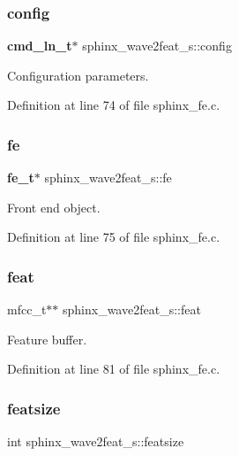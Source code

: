 \subsubsection{config}
{\footnotesize\ttfamily \textbf{ cmd\+\_\+ln\+\_\+t}$\ast$ sphinx\+\_\+wave2feat\+\_\+s\+::config}



Configuration parameters. 



Definition at line 74 of file sphinx\+\_\+fe.\+c.

\mbox{\label{structsphinx__wave2feat__s_a5882f148fe200890855304b46f00ee4b}} 
\subsubsection{fe}
{\footnotesize\ttfamily \textbf{ fe\+\_\+t}$\ast$ sphinx\+\_\+wave2feat\+\_\+s\+::fe}



Front end object. 



Definition at line 75 of file sphinx\+\_\+fe.\+c.

\mbox{\label{structsphinx__wave2feat__s_ab43d8d5721133bcaf02da23c0bbb58ae}} 
\subsubsection{feat}
{\footnotesize\ttfamily mfcc\+\_\+t$\ast$$\ast$ sphinx\+\_\+wave2feat\+\_\+s\+::feat}



Feature buffer. 



Definition at line 81 of file sphinx\+\_\+fe.\+c.

\mbox{\label{structsphinx__wave2feat__s_ac041852de738a42752be67cceb16660c}} 
\subsubsection{featsize}
{\footnotesize\ttfamily int sphinx\+\_\+wave2feat\+\_\+s\+::featsize}



